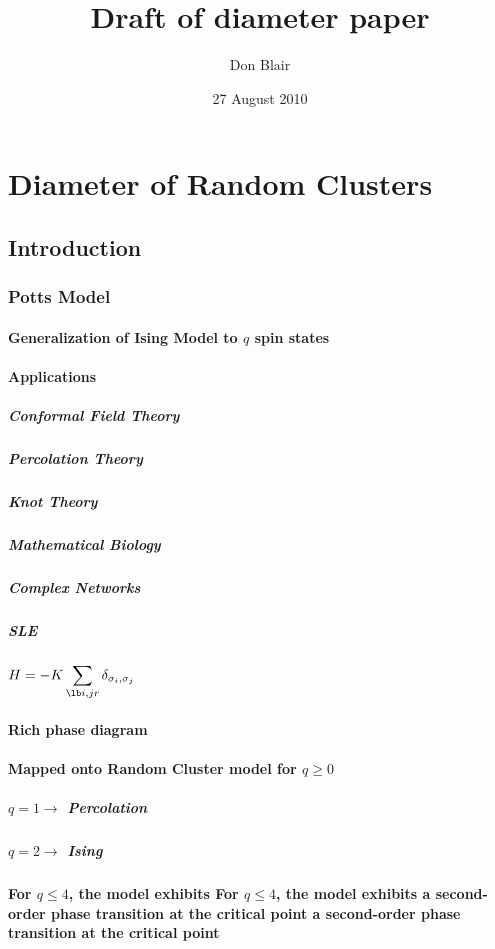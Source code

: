 \documentclass[pre,preprint]{revtex4-1}
\title{Draft of diameter paper}
\author{Don Blair}
\date{27 August 2010}
\begin{document}
\setcounter{tocdepth}{5}
\tableofcontents
\vspace*{1cm}



\section{Diameter of Random Clusters}
\label{sec-1}
\subsection{Introduction}
\label{sec-1.1}
\subsubsection{Potts Model \cite{Wu82}}
\label{sec-1.1.1}
\paragraph{Generalization of Ising Model to $q$ spin states}
\label{sec-1.1.1.1}
\paragraph{Applications}
\label{sec-1.1.1.2}
\subparagraph{Conformal Field Theory}
\label{sec-1.1.1.2.1}
\subparagraph{Percolation Theory}
\label{sec-1.1.1.2.2}
\subparagraph{Knot Theory}
\label{sec-1.1.1.2.3}
\subparagraph{Mathematical Biology}
\label{sec-1.1.1.2.4}
\subparagraph{Complex Networks}
\label{sec-1.1.1.2.5}
\subparagraph{SLE}
\label{sec-1.1.1.2.6}
\paragraph{$H=-K \displaystyle\sum_{\lb i,j r} \delta_{\sigma_i, \sigma_j}$}
\label{sec-1.1.1.3}
\paragraph{Rich phase diagram}
\label{sec-1.1.1.4}
\paragraph{Mapped onto Random Cluster model for $q \ge 0$}
\label{sec-1.1.1.5}
\subparagraph{$q = 1 \to$ Percolation}
\label{sec-1.1.1.5.1}
\subparagraph{$q = 2 \to$ Ising}
\label{sec-1.1.1.5.2}
\paragraph{For $q \le 4$, the model exhibits For $q \le 4$, the model exhibits a second-order phase transition at the critical point a second-order phase transition at the critical point}
\label{sec-1.1.1.6}
\end{document}
